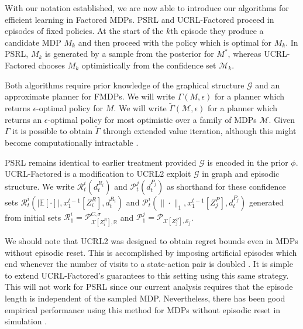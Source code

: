 \documentclass{article}
\newcommand{\Exp}{\mathds{E}}
\newcommand{\Real}{\mathds{R}}
\newcommand{\Xc}{\mathcal{X}}
\newcommand{\Pc}{\mathcal{P}}
\newcommand{\Gc}{\mathcal{G}}
\newcommand{\Rc}{\mathcal{R}}
\newcommand{\Sc}{\mathcal{S}}
\newcommand{\Mc}{\mathcal{M}}
\begin{document}
With our notation established, we are now able to introduce our algorithms for efficient learning in Factored MDPs.
PSRL and UCRL-Factored proceed in episodes of fixed policies.
At the start of the $k$th episode they produce a candidate MDP $M_k$ and then proceed with the policy which is optimal for $M_k$.
In PSRL, $M_k$ is generated by a sample from the posterior for $M^*$, whereas UCRL-Factored chooses $M_k$ optimistically from the confidence set $\Mc_k$.

Both algorithms require prior knowledge of the graphical structure $\Gc$ and an approximate planner for FMDPs.
We will write $\Gamma(M,\epsilon)$ for a planner which returns $\epsilon$-optimal policy for $M$.
We will write $\tilde{\Gamma}(\Mc,\epsilon)$ for a planner which returns an $\epsilon$-optimal policy for most optimistic over a family of MDPs $\Mc$.
Given $\Gamma$ it is possible to obtain $\tilde{\Gamma}$ through extended value iteration, although this might become computationally intractable \cite{jaksch2010near}.

PSRL remains identical to earlier treatment \cite{strens2000bayesian, osband2013more} provided $\Gc$ is encoded in the prior $\phi$.
UCRL-Factored is a modification to UCRL2 exploit $\Gc$ in graph and episodic structure.
We write $\Rc^i_t(d_t^{R_i})$ and $\Pc^j_t(d_t^{P_j})$ as shorthand for these confidence sets 
$\Rc^i_t( | \Exp[\cdot] |, x^{t-1}_1[Z^R_i],d_t^{R_i})$ and $\Pc^i_t( \| \cdot \|_1, x^{t-1}_1[Z^P_j],d_t^{P_j})$
generated from initial sets $\Rc^i_1 = \Pc^{C,\sigma}_{\Xc[Z^R_i],\Real}$ and $\Pc^j_1 = \Pc_{\Xc[Z^P_j],\Sc_j}$.

We should note that UCRL2 was designed to obtain regret bounds even in MDPs without episodic reset.
This is accomplished by imposing artificial episodes which end whenever the number of visits to a state-action pair is doubled \cite{jaksch2010near}.
It is simple to extend UCRL-Factored's guarantees to this setting using this same strategy.
This will not work for PSRL since our current analysis requires that the episode length is independent of the sampled MDP.
Nevertheless, there has been good empirical performance using this method for MDPs without episodic reset in simulation \cite{osband2013more}.


\end{document}
